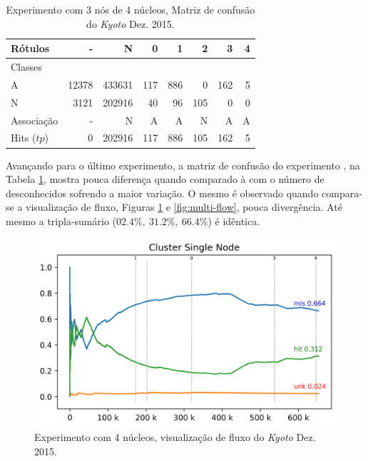\begin{table}[hbt]
  \centering
  \caption{Experimento \mfog \multi com 3 nós de 4 núcleos, Matriz de confusão do \dataset \emph{Kyoto} Dez. 2015.}
  \label{tab:multi-matrix}
  \begin{tabular}{l|r|r|r|r|r|r|r}
    Rótulos   &      - &       N &    0 &    1 &    2 &    3 &  4 \\\hline
    Classes   &        &         &      &      &      &      &    \\\hline
    \hline
    A      &  12378 &  433631 &  117 &  886 &    0 &  162 &  5 \\\hline
    N      &   3121 &  202916 &   40 &   96 &  105 &    0 &  0 \\\hline
    \hline
    Associação   &      - &       N &    A &    A &    N &    A &  A \\\hline
    Hits ($tp$)   &      0 &  202916 &  117 &  886 &  105 &  162 &  5 
  \end{tabular}
\end{table}

Avançando para o último experimento, a matriz de confusão do experimento \multi, 
na Tabela \ref{tab:multi-matrix}, mostra pouca diferença quando comparado à \single
com o número de desconhecidos sofrendo a maior variação.
O mesmo é observado quando compara-se a visualização de fluxo, Figuras
\ref{fig:single-flow} e \ref{fig:multi-flow}, pouca divergência.
Até mesmo a tripla-sumário ($02.4\%,\: 31.2\%,\: 66.4\%$) é idêntica.

\begin{figure}[htb]
  \centering
  \includegraphics[width=0.75\linewidth]{experiments/tmi-base-log.png}
  \caption{Experimento \mfog \single com 4 núcleos, visualização de fluxo do \dataset \emph{Kyoto} Dez. 2015.}
  \label{fig:single-flow}
\end{figure}

